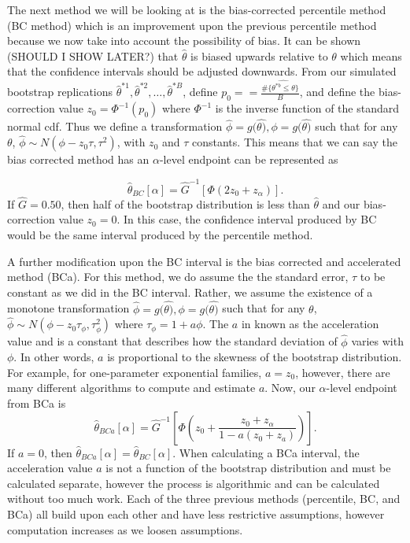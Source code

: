 \documentclass[12pt]{article}
\begin{document}
The next method we will be looking at is the bias-corrected percentile
method (BC method) which is an improvement upon the previous percentile
method because we now take into account the possibility of bias. It can
be shown (SHOULD I SHOW LATER?) that \(\hat{\theta}\) is biased upwards
relative to \(\theta\) which means that the confidence intervals should
be adjusted downwards. From our simulated bootstrap replications
\(\hat{\theta}^{*1}, \hat{\theta}^{*2}, \dots ,\hat{\theta}^{*B}\),
define \(p_0 = = \frac{\#\{\hat{\theta^{*b} \leq \theta}\}}{B}\), and
define the bias-correction value \(z_0 = \Phi^{-1}(p_0)\) where
\(\Phi^{-1}\) is the inverse function of the standard normal cdf. Thus
we define a transformation
\(\hat{\phi} = g(\hat{\theta)}, \phi = g(\hat{\theta)}\) such that for
any \(\theta\), \(\hat{\phi} \sim N(\phi - z_0\tau, \tau^2)\), with
\(z_0\) and \(\tau\) constants. This means that we can say the bias
corrected method has an \(\alpha\)-level endpoint can be represented as

\[\hat{\theta}_{BC}[\alpha] = \hat{G}^{-1} \left [ \Phi \left ( 2z_0 + z_\alpha\right ) \right ].\]
If \(\hat{G} = 0.50\), then half of the bootstrap distribution is less
than \(\hat{\theta}\) and our bias-correction value \(z_0 = 0\). In this
case, the confidence interval produced by BC would be the same interval
produced by the percentile method.

A further modification upon the BC interval is the bias corrected and
accelerated method (BCa). For this method, we do assume the the standard
error, \(\tau\) to be constant as we did in the BC interval. Rather, we
assume the existence of a monotone transformation
\(\hat{\phi} = g(\hat{\theta)}, \phi = g(\hat{\theta)}\) such that for
any \(\theta\), \(\hat{\phi} \sim N(\phi - z_0\tau_\phi, \tau_\phi^2)\)
where \(\tau_\phi = 1+ a\phi\). The \(a\) in known as the acceleration
value and is a constant that describes how the standard deviation of
\(\hat{\phi}\) varies with \(\phi\). In other words, \(a\) is
proportional to the skewness of the bootstrap distribution. For example,
for one-parameter exponential families, \(a=z_0\), however, there are
many different algorithms to compute and estimate \(a\). Now, our
\(\alpha\)-level endpoint from BCa is
\[\hat{\theta}_{BCa}[\alpha] = \hat{G}^{-1} \left [ \Phi \left ( z_0 + \frac{z_0+z_\alpha}{1-a(z_0+z_a)} \right ) \right ].\]
If \(a = 0\), then
\(\hat{\theta}_{BCa}[\alpha] = \hat{\theta}_{BC}[\alpha].\) When
calculating a BCa interval, the acceleration value \(a\) is not a
function of the bootstrap distribution and must be calculated separate,
however the process is algorithmic and can be calculated without too
much work. Each of the three previous methods (percentile, BC, and BCa)
all build upon each other and have less restrictive assumptions, however
computation increases as we loosen assumptions.
\end{document}
